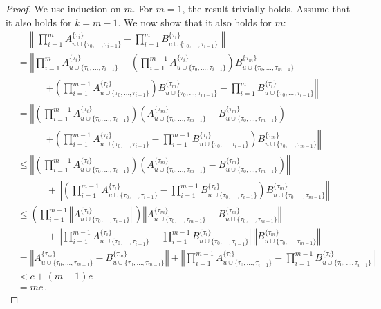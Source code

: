 \documentclass[a4paper,reqno]{amsart}
\newcommand{\norm}[1]{\left\lVert #1 \right\rVert}
\begin{document}
\begin{proof}
We use induction on $m$. For $m=1$, the result trivially holds. Assume that it also holds for $k=m-1$. We now show that it also holds for $m$:
\begin{align*}
&\quad \norm{\prod_{i=1}^m A_{u\cup\{\tau_0,\ldots,\tau_{i-1}\}}^{\{\tau_i\}} - \prod_{i=1}^m B_{u\cup\{\tau_0,\ldots,\tau_{i-1}\}}^{\{\tau_i\}}} \\
&= \left\Vert \prod_{i=1}^m A_{u\cup\{\tau_0,\ldots,\tau_{i-1}\}}^{\{\tau_i\}} - \left(\prod_{i=1}^{m-1} A_{u\cup\{\tau_0,\ldots,\tau_{i-1}\}}^{\{\tau_i\}}\right)B_{u\cup\{\tau_0,\ldots,\tau_{m-1}\}}^{\{\tau_m\}}  \right.\\
&\quad\quad\quad\left.+ \left(\prod_{i=1}^{m-1} A_{u\cup\{\tau_0,\ldots,\tau_{i-1}\}}^{\{\tau_i\}}\right)B_{u\cup\{\tau_0,\ldots,\tau_{m-1}\}}^{\{\tau_m\}} - \prod_{i=1}^m B_{u\cup\{\tau_0,\ldots,\tau_{i-1}\}}^{\{\tau_i\}}\right\Vert \\
&= \left\Vert \left(\prod_{i=1}^{m-1} A_{u\cup\{\tau_0,\ldots,\tau_{i-1}\}}^{\{\tau_i\}}\right)\left(A_{u\cup\{\tau_0,\ldots,\tau_{m-1}\}}^{\{\tau_m\}} - B_{u\cup\{\tau_0,\ldots,\tau_{m-1}\}}^{\{\tau_m\}}\right) \right. \\
&\quad\quad\quad\left.+ \left(\prod_{i=1}^{m-1} A_{u\cup\{\tau_0,\ldots,\tau_{i-1}\}}^{\{\tau_i\}} - \prod_{i=1}^{m-1} B_{u\cup\{\tau_0,\ldots,\tau_{i-1}\}}^{\{\tau_i\}}\right)B_{u\cup\{\tau_0,\ldots,\tau_{m-1}\}}^{\{\tau_m\}} \right\Vert \\
&\leq \left\Vert \left(\prod_{i=1}^{m-1} A_{u\cup\{\tau_0,\ldots,\tau_{i-1}\}}^{\{\tau_i\}}\right)\left(A_{u\cup\{\tau_0,\ldots,\tau_{m-1}\}}^{\{\tau_m\}} - B_{u\cup\{\tau_0,\ldots,\tau_{m-1}\}}^{\{\tau_m\}}\right) \right\Vert \\
&\quad\quad\quad+ \left\Vert\left(\prod_{i=1}^{m-1} A_{u\cup\{\tau_0,\ldots,\tau_{i-1}\}}^{\{\tau_i\}} - \prod_{i=1}^{m-1} B_{u\cup\{\tau_0,\ldots,\tau_{i-1}\}}^{\{\tau_i\}}\right)B_{u\cup\{\tau_0,\ldots,\tau_{m-1}\}}^{\{\tau_m\}} \right\Vert \\
&\leq \left(\prod_{i=1}^{m-1}\left\Vert A_{u\cup\{\tau_0,\ldots,\tau_{i-1}\}}^{\{\tau_i\}}\right\Vert \right)\left\Vert A_{u\cup\{\tau_0,\ldots,\tau_{m-1}\}}^{\{\tau_m\}} - B_{u\cup\{\tau_0,\ldots,\tau_{m-1}\}}^{\{\tau_m\}}\right\Vert \\
&\quad\quad\quad+ \left\Vert\prod_{i=1}^{m-1} A_{u\cup\{\tau_0,\ldots,\tau_{i-1}\}}^{\{\tau_i\}} - \prod_{i=1}^{m-1} B_{u\cup\{\tau_0,\ldots,\tau_{i-1}\}}^{\{\tau_i\}}\right\Vert\left\Vert B_{u\cup\{\tau_0,\ldots,\tau_{m-1}\}}^{\{\tau_m\}} \right\Vert \\
&= \left\Vert A_{u\cup\{\tau_0,\ldots,\tau_{m-1}\}}^{\{\tau_m\}} - B_{u\cup\{\tau_0,\ldots,\tau_{m-1}\}}^{\{\tau_m\}}\right\Vert + \left\Vert\prod_{i=1}^{m-1} A_{u\cup\{\tau_0,\ldots,\tau_{i-1}\}}^{\{\tau_i\}} - \prod_{i=1}^{m-1} B_{u\cup\{\tau_0,\ldots,\tau_{i-1}\}}^{\{\tau_i\}}\right\Vert \\
&< c + (m-1)c \\
&= mc\,.
\end{align*}
\end{proof}
\end{document}
